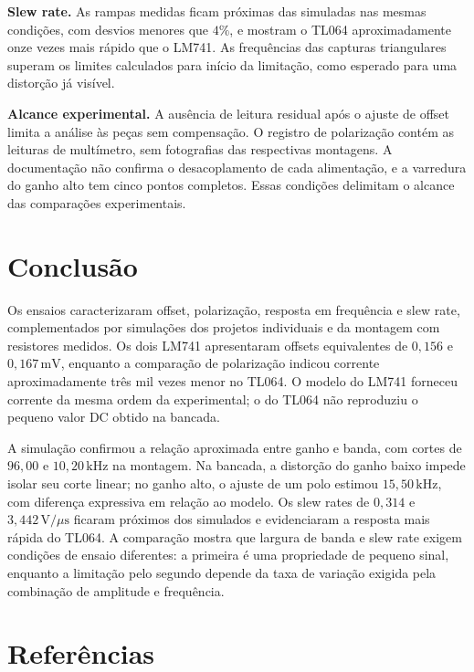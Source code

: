\documentclass[11pt,a4paper]{article}
\begin{document}
\textbf{Slew rate.} As rampas medidas ficam próximas das simuladas nas mesmas
condições, com desvios menores que \(4\%\), e mostram o TL064 aproximadamente onze
vezes mais rápido que o LM741. As frequências das capturas triangulares superam os
limites calculados para início da limitação, como esperado para uma distorção já visível.

\textbf{Alcance experimental.} A ausência de leitura residual após o ajuste de offset
limita a análise às peças sem compensação. O registro de polarização contém as leituras
de multímetro, sem fotografias das respectivas montagens. A documentação não confirma
o desacoplamento de cada alimentação, e a varredura do ganho alto tem cinco pontos
completos. Essas condições delimitam o alcance das comparações experimentais.

\section{Conclusão}
\label{sec:conclusao}

Os ensaios caracterizaram offset, polarização, resposta em frequência e slew rate,
complementados por simulações dos projetos individuais e da montagem com resistores medidos.
Os dois LM741 apresentaram offsets equivalentes de \(0{,}156\) e \(0{,}167\,\text{mV}\),
enquanto a comparação de polarização indicou corrente aproximadamente três mil vezes
menor no TL064. O modelo do LM741 forneceu corrente da mesma ordem da experimental;
o do TL064 não reproduziu o pequeno valor DC obtido na bancada.

A simulação confirmou a relação aproximada entre ganho e banda, com cortes de
\(96{,}00\) e \(10{,}20\,\text{kHz}\) na montagem. Na bancada, a distorção do ganho
baixo impede isolar seu corte linear; no ganho alto, o ajuste de um polo estimou
\(15{,}50\,\text{kHz}\), com diferença expressiva em relação ao modelo.
Os slew rates de \(0{,}314\) e \(3{,}442\,\text{V}/\mu\text{s}\) ficaram próximos
dos simulados e evidenciaram a resposta mais rápida do TL064. A comparação mostra
que largura de banda e slew rate exigem condições de ensaio diferentes: a primeira
é uma propriedade de pequeno sinal, enquanto a limitação pelo segundo depende da taxa
de variação exigida pela combinação de amplitude e frequência.

\section{Referências}
\end{document}
